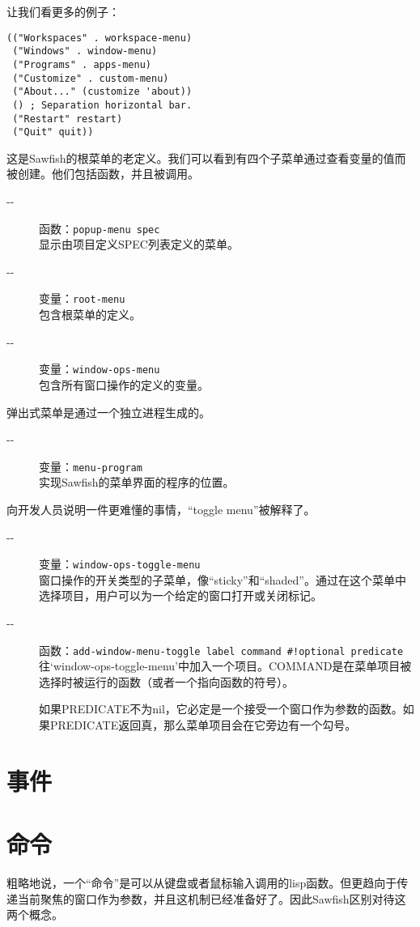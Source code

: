 \documentclass{book}
\begin{document}
\begin{CJK*}{UTF8}{gbsn}
让我们看更多的例子：
\begin{verbatim}
(("Workspaces" . workspace-menu)
 ("Windows" . window-menu)
 ("Programs" . apps-menu)
 ("Customize" . custom-menu)
 ("About..." (customize 'about))
 () ; Separation horizontal bar.
 ("Restart" restart)
 ("Quit" quit))
\end{verbatim}
这是Sawfish的根菜单的老定义。我们可以看到有四个子菜单通过查看变量的值而被创建。他们包括函数，并且被调用。
\begin{description}
\item[-{}-] 函数：\verb|popup-menu spec|\\
显示由项目定义SPEC列表定义的菜单。
\item[-{}-] 变量：\verb|root-menu|\\
包含根菜单的定义。
\item[-{}-] 变量：\verb|window-ops-menu|\\
包含所有窗口操作的定义的变量。
\end{description}

弹出式菜单是通过一个独立进程生成的。
\begin{description}
\item[-{}-] 变量：\verb|menu-program|\\
实现Sawfish的菜单界面的程序的位置。
\end{description}

向开发人员说明一件更难懂的事情，``toggle menu''被解释了。
\begin{description}
\item[-{}-] 变量：\verb|window-ops-toggle-menu|\\
窗口操作的开关类型的子菜单，像``sticky''和``shaded''。通过在这个菜单中选择项目，用户可以为一个给定的窗口打开或关闭标记。
\item[-{}-] 函数：\verb|add-window-menu-toggle label command #!optional predicate|\\
往`window-ops-toggle-menu'中加入一个项目。COMMAND是在菜单项目被选择时被运行的函数（或者一个指向函数的符号）。

如果PREDICATE不为nil，它必定是一个接受一个窗口作为参数的函数。如果PREDICATE返回真，那么菜单项目会在它旁边有一个勾号。
\end{description}
\chapter{事件}
\chapter{命令}
粗略地说，一个``命令''是可以从键盘或者鼠标输入调用的lisp函数。但更趋向于传递当前聚焦的窗口作为参数，并且这机制已经准备好了。因此Sawfish区别对待这两个概念。


\end{CJK*}
\end{document}
